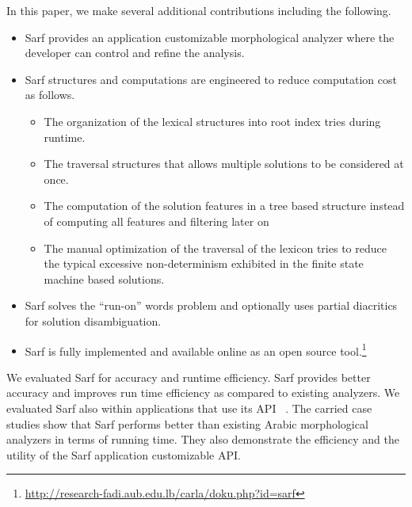 In this paper, we make several additional contributions including the following. 
\begin{itemize}
    \item Sarf provides an application customizable morphological analyzer where the developer can control and refine the analysis. 
    \item Sarf structures and computations are engineered to reduce computation cost as follows. 
      \begin{itemize}
        \item The organization of the lexical structures into root index tries during runtime.
        \item The traversal structures that allows multiple solutions to be considered at once.
        \item The computation of the solution features in a tree based structure instead of computing all features and filtering later on
        \item The manual optimization of the traversal of the lexicon tries to reduce the typical excessive non-determinism exhibited in the finite state machine based solutions.
      \end{itemize}
    \item Sarf solves the ``run-on'' words problem and optionally uses partial diacritics for solution disambiguation. 
    \item Sarf is fully implemented and available online as an open source tool.\footnote{\label{fn:online} \url{http://research-fadi.aub.edu.lb/carla/doku.php?id=sarf} }
\end{itemize}

We evaluated Sarf for %
accuracy and runtime efficiency.
Sarf %
provides better accuracy 
and improves run time efficiency as compared to existing analyzers.  
%
We evaluated Sarf also within applications that use its API 
~\citep{JaZaMatar,ZaMaFlairs2012HadithBio,ZaMa2012IJCLATime,ZaMaHaCicling2012Entity}. 
The carried case studies show that Sarf performs better than existing Arabic morphological analyzers in terms of running time. 
They also demonstrate the efficiency and the utility of the Sarf 
application customizable API. 

